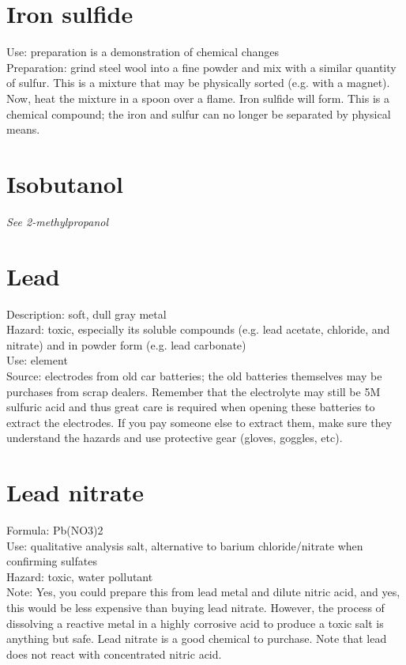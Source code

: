 \section{Iron sulfide}
Use: preparation is a demonstration of chemical changes\\
Preparation: grind steel wool into a fine powder 
and mix with a similar quantity of sulfur. 
This is a mixture that may be physically sorted (e.g. 
with a magnet). 
Now, 
heat the mixture in a spoon over a flame. 
Iron sulfide will form. 
This is a chemical compound; 
the iron and sulfur can no longer be separated by physical means.

\section{Isobutanol}
\textit{See 2-methylpropanol}

\section{Lead}
Description: soft, 
dull gray metal\\
Hazard: toxic, 
especially its soluble compounds (e.g. 
lead acetate, 
chloride, 
and nitrate) and in powder form (e.g. 
lead carbonate)\\
Use: element\\
Source: electrodes from old car batteries; 
the old batteries themselves may be purchases from scrap dealers. 
Remember that the electrolyte may still be 5M sulfuric acid 
and thus great care is required 
when opening these batteries to extract the electrodes. 
If you pay someone else to extract them, 
make sure they understand the hazards and use protective gear (gloves, 
goggles, 
etc).

\section{Lead nitrate}
Formula: Pb(NO3)2\\
Use: qualitative analysis salt, 
alternative to barium chloride/nitrate when confirming sulfates\\
Hazard: toxic, 
water pollutant\\
Note: Yes, 
you could prepare this from lead metal and dilute nitric acid, 
and yes, 
this would be less expensive than buying lead nitrate. 
However, 
the process of dissolving a reactive metal in a highly corrosive acid 
to produce a toxic salt is anything but safe. 
Lead nitrate is a good chemical to purchase. 
Note that lead does not react with concentrated nitric acid.

